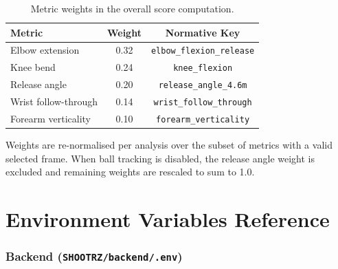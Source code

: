 \begin{table}[H]
  \centering
  \caption{Metric weights in the overall score computation.}
  \label{tab:weights}
  \begin{tabular}{lcc}
    \toprule
    \textbf{Metric} & \textbf{Weight} & \textbf{Normative Key} \\
    \midrule
    Elbow extension & 0.32 & \lstinline|elbow_flexion_release| \\
    Knee bend & 0.24 & \lstinline|knee_flexion| \\
    Release angle & 0.20 & \lstinline|release_angle_4.6m| \\
    Wrist follow-through & 0.14 & \lstinline|wrist_follow_through| \\
    Forearm verticality & 0.10 & \lstinline|forearm_verticality| \\
    \bottomrule
  \end{tabular}
\end{table}

\noindent Weights are re-normalised per analysis over the subset of metrics with a valid selected frame. When ball tracking is disabled, the release angle weight is excluded and remaining weights are rescaled to sum to 1.0.

\chapter{Environment Variables Reference}
\label{app:env}

\subsection*{Backend (\texttt{SHOOTRZ/backend/.env})}

